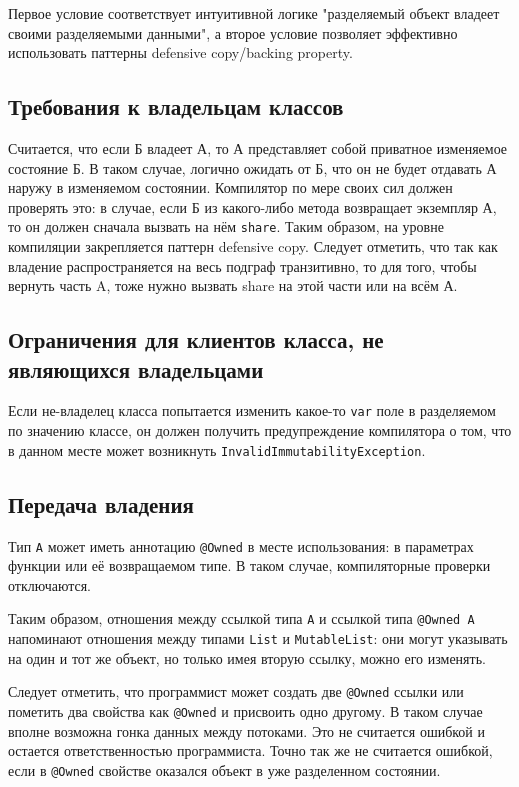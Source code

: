 \documentclass[specification,annotation,times]{itmo-student-thesis}
\begin{document}
Первое условие соответствует интуитивной логике "разделяемый объект владеет своими разделяемыми данными", а второе условие позволяет эффективно использовать паттерны defensive copy/backing property.

\subsection{Требования к владельцам классов}

Считается, что если Б владеет А, то А представляет собой приватное изменяемое состояние Б.
В таком случае, логично ожидать от Б, что он не будет отдавать А наружу в изменяемом состоянии.
Компилятор по мере своих сил должен проверять это: в случае, если Б из какого-либо метода возвращает экземпляр А, то он должен сначала вызвать на нём \texttt{share}.
Таким образом, на уровне компиляции закрепляется паттерн defensive copy.
Следует отметить, что так как владение распространяется на весь подграф транзитивно, то для того, чтобы вернуть часть A, тоже нужно вызвать share на этой части или на всём А.

\subsection{Ограничения для клиентов класса, не являющихся владельцами}

Если не-владелец класса попытается изменить какое-то \texttt{var} поле в разделяемом по значению классе, он должен получить предупреждение компилятора о том, что в данном месте может возникнуть \texttt{InvalidImmutabilityException}.

\subsection{Передача владения}

Тип \texttt{А} может иметь аннотацию \texttt{@Owned} в месте использования: в параметрах функции или её возвращаемом типе. В таком случае, компиляторные проверки отключаются.

Таким образом, отношения между ссылкой типа \texttt{А} и ссылкой типа \texttt{@Owned A} напоминают отношения между типами \texttt{List} и \texttt{MutableList}: они могут указывать на один и тот же объект, но только имея вторую ссылку, можно его изменять.

Следует отметить, что программист может создать две \texttt{@Owned} ссылки или пометить два свойства как \texttt{@Owned} и присвоить одно другому. В таком случае вполне возможна гонка данных между потоками. Это не считается ошибкой и остается ответственностью программиста.
Точно так же не считается ошибкой, если в \texttt{@Owned} свойстве оказался объект в уже разделенном состоянии.
\end{document}
